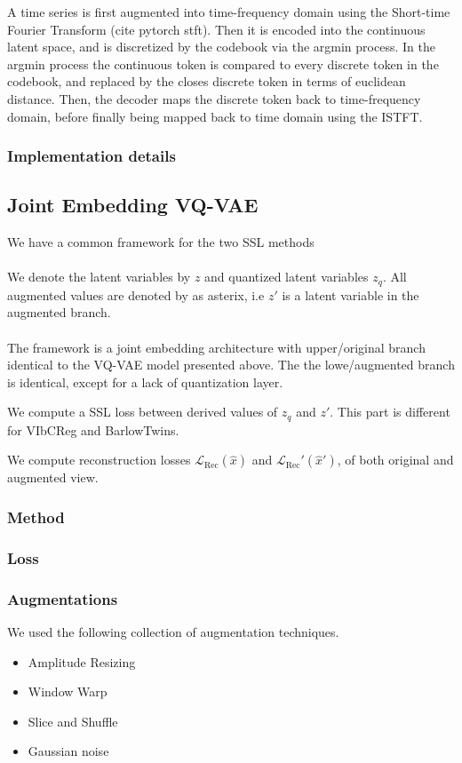 \documentclass[../../thesis.tex]{subfiles}
\begin{document}
A time series is first augmented into time-frequency domain using the Short-time Fourier Transform (cite pytorch stft). Then it is encoded into the continuous latent space, and is discretized by the codebook via the argmin process. In the argmin process the continuous token is compared to every discrete token in the codebook, and replaced by the closes discrete token in terms of euclidean distance. Then, the decoder maps the discrete token back to time-frequency domain, before finally being mapped back to time domain using the ISTFT.




\subsubsection{Implementation details}


\subsection{Joint Embedding VQ-VAE}
We have a common framework for the two SSL methods\\\\
We denote the latent variables by $z$ and quantized latent variables $z_q$. All augmented values are denoted by as asterix, i.e $z'$ is a latent variable in the augmented branch. \\\\


The framework is a joint embedding architecture with upper/original branch identical to the VQ-VAE model presented above. The the lowe/augmented branch is identical, except for a lack of quantization layer. 

We compute a SSL loss between derived values of $z_q$ and $z'$. This part is different for VIbCReg and BarlowTwins.  

We compute reconstruction losses $\mathcal{L}_{\text{Rec}}(\hat{x})$ and $\mathcal{L}_{\text{Rec}}'(\hat{x}')$, of both original and augmented view. 


\subsubsection{Method}

\subsubsection{Loss}


\subsubsection{Augmentations}
We used the following collection of augmentation techniques.
\begin{itemize}
    \item Amplitude Resizing
    \item Window Warp
    \item Slice and Shuffle
    \item Gaussian noise
\end{itemize}
\end{document}
